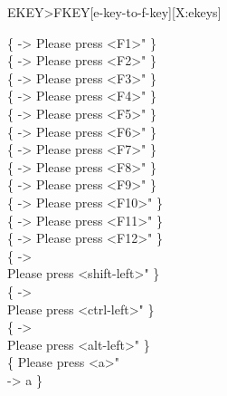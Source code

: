 \begin{worddef}[EKEYtoFKEY]{}{EKEY>FKEY}[e-key-to-f-key][X:ekeys]
\begin{defer}
		\{      ->   Please press <F1>"      \} \\
		\{      ->   Please press <F2>"      \} \\
		\{      ->   Please press <F3>"      \} \\
		\{      ->   Please press <F4>"      \} \\
		\{      ->   Please press <F5>"      \} \\
		\{      ->   Please press <F6>"      \} \\
		\{      ->   Please press <F7>"      \} \\
		\{      ->   Please press <F8>"      \} \\
		\{      ->   Please press <F9>"      \} \\
		\{     ->   Please press <F10>"     \} \\
		\{     ->   Please press <F11>"     \} \\
		\{     ->   Please press <F12>"     \} \\

		\{     -> \\
		\tab {}  Please press <shift-left>"   \} \\
		\{      -> \\
		\tab {}  Please press <ctrl-left>"    \} \\
		\{       -> \\
		\tab {}  Please press <alt-left>"     \} \\

		\{   Please press <a>"      \\
		\tab ->   a  \}
	\end{defer}
\end{worddef}


